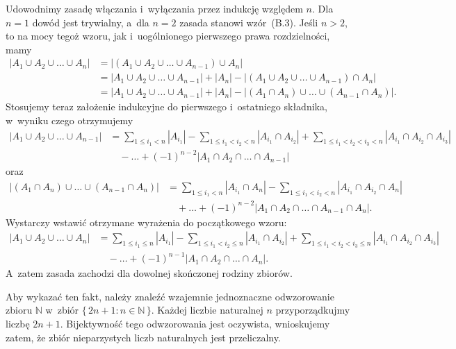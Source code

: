 \exercise %
Udowodnimy zasadę włączania i~wyłączania przez indukcję względem $n$. Dla $n=1$ dowód jest trywialny, a~dla $n=2$ zasada stanowi wzór~(B.3). Jeśli $n>2$, to na mocy tegoż wzoru, jak i~uogólnionego pierwszego prawa rozdzielności, mamy
\begin{align*}
    |A_1\cup A_2\cup\dots\cup A_n| &= \bigl|(A_1\cup A_2\cup\dots\cup A_{n-1})\cup A_n\bigr| \\
	&= |A_1\cup A_2\cup\dots\cup A_{n-1}|+|A_n|-\bigl|(A_1\cup A_2\cup\dots\cup A_{n-1})\cap A_n\bigr| \\
	&= |A_1\cup A_2\cup\dots\cup A_{n-1}|+|A_n|-\bigl|(A_1\cap A_n)\cup\dots\cup(A_{n-1}\cap A_n)\bigr|.
\end{align*}
Stosujemy teraz założenie indukcyjne do pierwszego i~ostatniego składnika, w~wyniku czego otrzymujemy
\begin{align*}
	|A_1\cup A_2\cup\dots\cup A_{n-1}| &= \sum_{1\le i_1<n}|A_{i_1}|-\sum_{1\le i_1<i_2<n}|A_{i_1}\cap A_{i_2}|+\sum_{1\le i_1<i_2<i_3<n}|A_{i_1}\cap A_{i_2}\cap A_{i_3}| \\[1mm]
	&\quad {}-\dots+(-1)^{n-2}|A_1\cap A_2\cap\dots\cap A_{n-1}|
\end{align*}
oraz
\begin{align*}
	\bigl|(A_1\cap A_n)\cup\dots\cup(A_{n-1}\cap A_n)\bigr| &= \sum_{1\le i_1<n}|A_{i_1}\cap A_n|-\sum_{1\le i_1<i_2<n}|A_{i_1}\cap A_{i_2}\cap A_n|\\[1mm]
	&\quad {}+\dots+(-1)^{n-2}|A_1\cap A_2\cap\dots\cap A_{n-1}\cap A_n|.
\end{align*}
Wystarczy wstawić otrzymane wyrażenia do początkowego wzoru:
\begin{align*}
	|A_1\cup A_2\cup\dots\cup A_n| &= \sum_{1\le i_1\le n}|A_{i_1}|-\sum_{1\le i_1<i_2\le n}|A_{i_1}\cap A_{i_2}|+\sum_{1\le i_1<i_2<i_3\le n}|A_{i_1}\cap A_{i_2}\cap A_{i_3}| \\[1mm]
	&\quad {}-\dots+(-1)^{n-1}|A_1\cap A_2\cap\dots\cap A_n|.
\end{align*}
A~zatem zasada zachodzi dla dowolnej skończonej rodziny zbiorów.

\exercise %

\noindent Aby wykazać ten fakt, należy znaleźć wzajemnie jednoznaczne odwzorowanie zbioru $\mathbb{N}$ w~zbiór $\bigl\{\,2n+1:n\in\mathbb{N}\,\bigr\}$. Każdej liczbie naturalnej $n$ przyporządkujmy liczbę $2n+1$. Bijektywność tego odwzorowania jest oczywista, wnioskujemy zatem, że zbiór nieparzystych liczb naturalnych jest przeliczalny.

